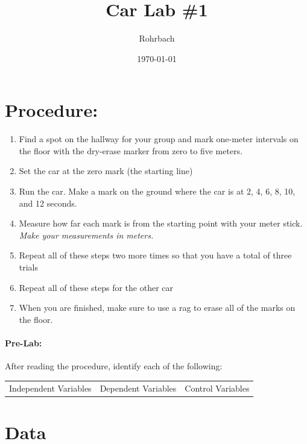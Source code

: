 \documentclass[10pt]{exam}
\title{Car Lab \#1}
\author{Rohrbach}
\date{\today}
\begin{document}
\maketitle

\vspace{-1em}
\section*{Procedure:}
  \begin{enumerate}[label=\alph*),topsep=0pt,itemsep=-1ex,partopsep=1ex,parsep=1ex]
    \item 
      Find a spot on the hallway for your group and mark one-meter intervals on the floor with the dry-erase marker from zero to five meters.
    \item 
      Set the car at the zero mark (the starting line)
    \item
      Run the car.  Make a mark on the ground where the car is at 2, 4, 6, 8, 10, and 12 seconds.
    \item
      Measure how far each mark is from the starting point with your meter stick.  \emph{Make your measurements in meters.}
    \item
      Repeat all of these steps two more times so that you have a total of three trials
    \item 
      Repeat all of these steps for the other car
    \item 
      When you are finished, make sure to use a rag to erase all of the marks on the floor.
  \end{enumerate}

  \paragraph{Pre-Lab:} After reading the procedure, identify each of the following:

    \begin{center}
      \begin{tabular}
        { m{} | m{}| m{} } 
        Independent Variables & 
        Dependent Variables   & 
        Control Variables  \\[10em]
      \end{tabular}
    \end{center}

\vspace{-2em}
\section*{Data}
\end{document}
